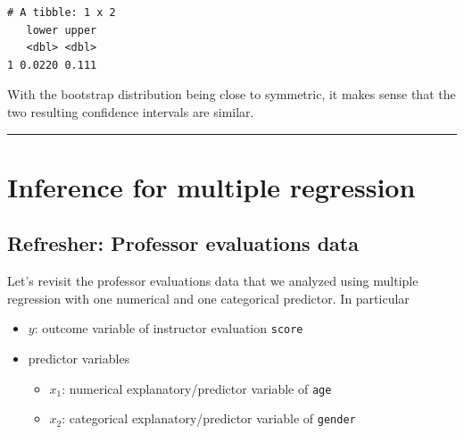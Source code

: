 \documentclass[12pt, krantz2,]{krantz}
\makeatletter
\newenvironment{Shaded}{\begin{snugshade}}{\end{snugshade}}
\newcommand{\DataTypeTok}[1]{\textcolor[rgb]{0.27,0.27,0.27}{#1}}
\newcommand{\FloatTok}[1]{\textcolor[rgb]{0.06,0.06,0.06}{#1}}
\newcommand{\KeywordTok}[1]{\textcolor[rgb]{0.27,0.27,0.27}{\textbf{#1}}}
\newcommand{\NormalTok}[1]{#1}
\newcommand{\OperatorTok}[1]{\textcolor[rgb]{0.43,0.43,0.43}{\textbf{#1}}}
\newcommand{\StringTok}[1]{\textcolor[rgb]{0.5,0.5,0.5}{#1}}
\providecommand{\tightlist}{%
  \setlength{\itemsep}{0pt}\setlength{\parskip}{0pt}}
\newenvironment{kframe}{%
\medskip{}
\setlength{\fboxsep}{.8em}
 \def\at@end@of@kframe{}%
 \ifinner\ifhmode%
  \def\at@end@of@kframe{\end{minipage}}%
  \begin{minipage}{\columnwidth}%
 \fi\fi%
 \def\FrameCommand##1{\hskip\@totalleftmargin \hskip-\fboxsep
 \colorbox{shadecolor}{##1}\hskip-\fboxsep
     \hskip-\linewidth \hskip-\@totalleftmargin \hskip\columnwidth}%
 \MakeFramed {\advance\hsize-\width
   \@totalleftmargin\z@ \linewidth\hsize
   \@setminipage}}%
 {\par\unskip\endMakeFramed%
 \at@end@of@kframe}
\renewenvironment{Shaded}{\begin{kframe}}{\end{kframe}}
\makeatother
\begin{document}
\begin{Shaded}
\end{Shaded}

\begin{verbatim}
# A tibble: 1 x 2
   lower upper
   <dbl> <dbl>
1 0.0220 0.111
\end{verbatim}

With the bootstrap distribution being close to symmetric, it makes sense that the two resulting confidence intervals are similar.

\begin{center}\rule{0.5\linewidth}{\linethickness}\end{center}

\hypertarget{inference-for-multiple-regression}{%
\section{Inference for multiple regression}\label{inference-for-multiple-regression}}

\hypertarget{refresher-professor-evaluations-data}{%
\subsection{Refresher: Professor evaluations data}\label{refresher-professor-evaluations-data}}

Let's revisit the professor evaluations data that we analyzed using multiple regression with one numerical and one categorical predictor. In particular

\begin{itemize}
\tightlist
\item
  \(y\): outcome variable of instructor evaluation \texttt{score}
\item
  predictor variables

  \begin{itemize}
  \tightlist
  \item
    \(x_1\): numerical explanatory/predictor variable of \texttt{age}
  \item
    \(x_2\): categorical explanatory/predictor variable of \texttt{gender}
  \end{itemize}
\end{itemize}
\end{document}
